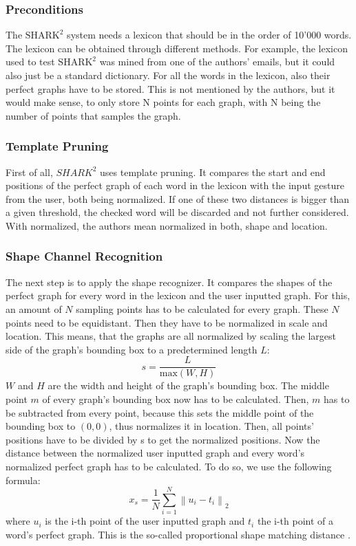 \subsubsection{Preconditions}
The $\text{SHARK}^2$ system needs a lexicon that should be in the order of 10'000 words. The lexicon can be obtained through different methods. For example, the lexicon used to test $\text{SHARK}^2$ was mined from one of the authors' emails, but it could also just be a standard dictionary. For all the words in the lexicon, also their perfect graphs have to be stored. This is not mentioned by the authors, but it would make sense, to only store N points for each graph, with N being the number of points that samples the graph.

\subsubsection{Template Pruning}
First of all, $SHARK^2$ uses template pruning. It compares the start and end positions of the perfect graph of each word in the lexicon with the input gesture from the user, both being normalized. If one of these two distances is bigger than a given threshold, the checked word will be discarded and not further considered. With normalized, the authors mean normalized in both, shape and location.

\subsubsection{Shape Channel Recognition}
\label{normalize}
The next step is to apply the shape recognizer. It compares the shapes of the perfect graph for every word in the lexicon and the user inputted graph. For this, an amount of $N$ sampling points has to be calculated for every graph. These $N$ points need to be equidistant. Then they have to be normalized in scale and location. This means, that the graphs are all normalized by scaling the largest side of the graph's bounding box to a predetermined length $L$: 
\begin{equation}
    s = \frac{L}{\text{max}(W,H)}
\end{equation}
$W$ and $H$ are the width and height of the graph's bounding box. The middle point $m$ of every graph's bounding box now has to be calculated. Then, $m$ has to be subtracted from every point, because this sets the middle point of the bounding box to $(0,0)$, thus normalizes it in location. Then, all points' positions have to be divided by s to get the normalized positions. Now the distance between the normalized user inputted graph and every word's normalized perfect graph has to be calculated. To do so, we use the following formula:
\begin{equation}
    x_s = \frac{1}{N}\sum_{i = 1}^{N}\left\lVert u_i - t_i\right\rVert_2
\end{equation}
where $u_i$ is the i-th point of the user inputted graph and $t_i$ the i-th point of a word's perfect graph. This is the so-called proportional shape matching distance \cite{Kristensson2004SHARK2AL}.

